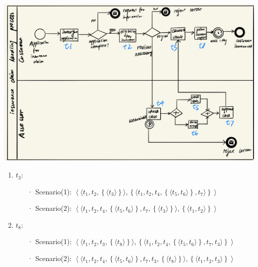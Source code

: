 \documentclass[runningheads]{llncs}
\begin{document}
\begin{itemize}
\includegraphics[scale=0.18]{scenario.jpeg}
\begin{enumerate}
    \item $t_3$:
        \begin{itemize}
            \item[·] Scenario(1): $\left \langle \langle t_1,t_2,\left\{\langle t_3 \rangle \right\} \rangle, \left\{\langle t_1,t_2,t_4,\left\{\langle t_5,t_6 \rangle \right\},t_7 \rangle \right\}\right \rangle$
            \item[·] Scenario(2): $\left \langle \langle t_1,t_2,t_4,\left\{\langle t_5,t_6 \rangle \right\},t_7,\left\{\langle t_3 \rangle \right\} \rangle, \left\{\langle t_1,t_2 \rangle\right\}\right \rangle$
        \end{itemize}
    \item $t_8$:
        \begin{itemize}
            \item[·] Scenario(1): $\left \langle \langle t_1,t_2,t_3,\left\{\langle t_8 \rangle \right\}\rangle, \left\{\langle t_1,t_2,t_4,\left\{\langle t_5,t_6 \rangle \right\},t_7,t_3 \rangle \right\}\right \rangle$
            \item[·] Scenario(2): $\left \langle \langle t_1,t_2,t_4,\left\{\langle t_5,t_6 \rangle \right\},t_7,t_3,\left\{\langle t_8 \rangle \right\}\rangle , \left\{\langle t_1,t_2,t_3 \rangle \right\}\right \rangle$
            
        \end{itemize}
    
\end{enumerate}





\end{itemize}
\end{document}
